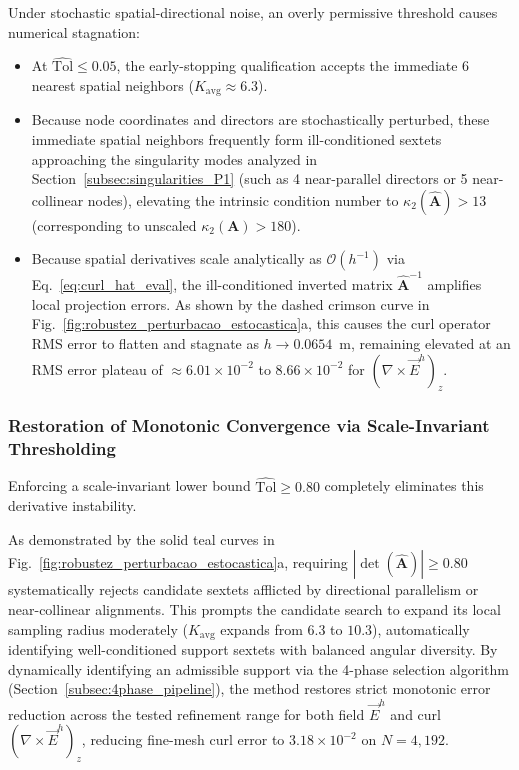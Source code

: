 \documentclass[preprint,12pt]{elsarticle}
\begin{document}
Under stochastic spatial-directional noise, an overly permissive threshold causes numerical stagnation:
\begin{itemize}
    \item At $\widehat{\mathrm{Tol}} \le 0.05$, the early-stopping qualification accepts the immediate 6 nearest spatial neighbors ($K_{\mathrm{avg}} \approx 6.3$).
    \item Because node coordinates and directors are stochastically perturbed, these immediate spatial neighbors frequently form ill-conditioned sextets approaching the singularity modes analyzed in Section~\ref{subsec:singularities_P1} (such as 4 near-parallel directors or 5 near-collinear nodes), elevating the intrinsic condition number to $\kappa_2(\widehat{\mathbf{A}}) > 13$ (corresponding to unscaled $\kappa_2(\mathbf{A}) > 180$).
    \item Because spatial derivatives scale analytically as $\mathcal{O}(h^{-1})$ via Eq.~\eqref{eq:curl_hat_eval}, the ill-conditioned inverted matrix $\widehat{\mathbf{A}}^{-1}$ amplifies local projection errors. As shown by the dashed crimson curve in Fig.~\ref{fig:robustez_perturbacao_estocastica}a, this causes the curl operator RMS error to flatten and stagnate as $h \to 0.0654$~m, remaining elevated at an RMS error plateau of $\approx 6.01 \times 10^{-2}$ to $8.66 \times 10^{-2}$ for $(\nabla \times \vec{E}^h)_z$.
\end{itemize}

\subsubsection{Restoration of Monotonic Convergence via Scale-Invariant Thresholding}
\label{subsubsec:restoration_via_thresholding}

Enforcing a scale-invariant lower bound $\widehat{\mathrm{Tol}} \ge 0.80$ completely eliminates this derivative instability.

As demonstrated by the solid teal curves in Fig.~\ref{fig:robustez_perturbacao_estocastica}a, requiring $|\det(\widehat{\mathbf{A}})| \ge 0.80$ systematically rejects candidate sextets afflicted by directional parallelism or near-collinear alignments. This prompts the candidate search to expand its local sampling radius moderately ($K_{\mathrm{avg}}$ expands from $6.3$ to $10.3$), automatically identifying well-conditioned support sextets with balanced angular diversity. By dynamically identifying an admissible support via the 4-phase selection algorithm (Section~\ref{subsec:4phase_pipeline}), the method restores strict monotonic error reduction across the tested refinement range for both field $\vec{E}^h$ and curl $(\nabla \times \vec{E}^h)_z$, reducing fine-mesh curl error to $3.18 \times 10^{-2}$ on $N = 4{,}192$.
\end{document}
